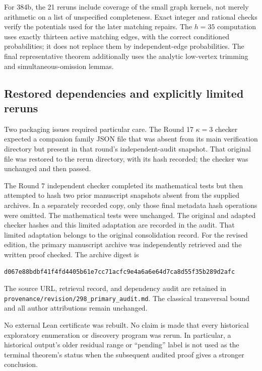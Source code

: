 \documentclass[11pt,a4paper]{article}
\theoremstyle{definition}\newtheorem{definition}[theorem]{Definition}
\theoremstyle{remark}\newtheorem{remark}[theorem]{Remark}
\begin{document}
For 384b, the 21 reruns include coverage of the small graph kernels,
not merely arithmetic on a list of unspecified completeness. Exact
integer and rational checks verify the potentials used for the later
matching repairs. The $h=35$ computation uses exactly thirteen active
matching edges, with the correct conditioned probabilities; it does
not replace them by independent-edge probabilities. The final
representative theorem additionally uses the analytic low-vertex
trimming and simultaneous-omission lemmas.

\subsection{Restored dependencies and explicitly limited reruns}
Two packaging issues required particular care. The Round 17
$\kappa=3$ checker expected a companion family JSON file that was
absent from its main verification directory but present in that
round's independent-audit snapshot. That original file was restored
to the rerun directory, with its hash recorded; the checker was
unchanged and then passed.

The Round 7 independent checker completed its mathematical tests but
then attempted to hash two prior manuscript snapshots absent from
the supplied archives. In a separately recorded copy, only those
final metadata hash operations were omitted. The mathematical tests
were unchanged. The original and adapted checker hashes and this
limited adaptation are recorded in the audit. That limited adaptation belongs to the original consolidation record.
For the revised edition, the primary manuscript archive was independently
retrieved and the written proof checked. The archive digest is
\begin{center}\small\texttt{d067e88bdbf41f4fd4405b61e7cc71acfc9e4a6a6e64d7ca8d55f35b289d2afc}\end{center}
The source URL, retrieval record, and dependency audit are retained in
\nolinkurl{provenance/revision/298_primary_audit.md}. The classical
transversal bound and all author attributions remain unchanged.

No external Lean certificate was rebuilt. No claim is made that every
historical exploratory enumeration or discovery program was rerun.
In particular, a historical output's older residual range or
``pending'' label is not used as the terminal theorem's status when
the subsequent audited proof gives a stronger conclusion.
\end{document}
